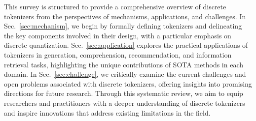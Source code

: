 This survey is structured to provide a comprehensive overview of discrete tokenizers from the perspectives of mechanisms, applications, and challenges.
In Sec.~\ref{sec:mechanism}, we begin by formally defining tokenizers and delineating the key components involved in their design, with a particular emphasis on discrete quantization.
Sec.~\ref{sec:application} explores the practical applications of tokenizers in generation, comprehension, recommendation, and information retrieval tasks, highlighting the unique contributions of SOTA methods in each domain. 
In Sec.~\ref{sec:challenge}, we critically examine the current challenges and open problems associated with discrete tokenizers, offering insights into promising directions for future research. 
Through this systematic review, we aim to equip researchers and practitioners with a deeper understanding of discrete tokenizers and inspire innovations that address existing limitations in the field.


















